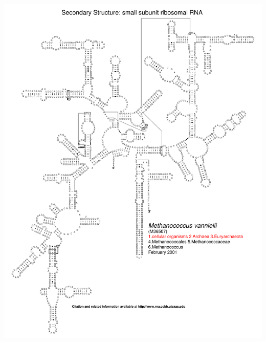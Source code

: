 \documentclass[landscape]{slides}
\begin{document}
\begin{slide}\begin{center}\includegraphics[height=8in]{figs/arc-11}\end{center}\vfill\end{slide}
\end{document}
